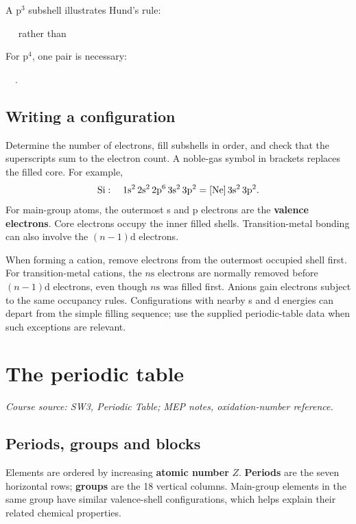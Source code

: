 \documentclass[a4paper,10pt]{article}
\newcommand{\source}[1]{{\small\textit{Course source: #1.}\par}}
\newcommand{\orbital}[1]{\fbox{\makebox[1.25em]{\ensuremath{#1}}}}
\newcommand{\chapterbreak}{\clearpage}
\begin{document}
A $\mathrm p^3$ subshell illustrates Hund's rule:
\begin{center}
\orbital{\uparrow}\ \orbital{\uparrow}\ \orbital{\uparrow}
\qquad rather than \qquad
\orbital{\uparrow\downarrow}\ \orbital{\uparrow}\ \orbital{}
\end{center}
For $\mathrm p^4$, one pair is necessary:
\begin{center}
\orbital{\uparrow\downarrow}\ \orbital{\uparrow}\ \orbital{\uparrow}.
\end{center}

\subsection{Writing a configuration}
Determine the number of electrons, fill subshells in order, and check that the
superscripts sum to the electron count. A noble-gas symbol in brackets replaces
the filled core. For example,
\[
 \ce{Si}:\quad 1\mathrm s^2\,2\mathrm s^2\,2\mathrm p^6\,3\mathrm s^2\,3\mathrm p^2
 =[\ce{Ne}]\,3\mathrm s^2\,3\mathrm p^2.
\]
For main-group atoms, the outermost s and p electrons are the
\textbf{valence electrons}. Core electrons occupy the inner filled shells.
Transition-metal bonding can also involve the $(n-1)\mathrm d$ electrons.

When forming a cation, remove electrons from the outermost occupied shell first.
For transition-metal cations, the $n\mathrm s$ electrons are normally removed
before $(n-1)\mathrm d$ electrons, even though $n\mathrm s$ was filled first.
Anions gain electrons subject to the same occupancy rules.
Configurations with nearby s and d energies can depart from the simple filling
sequence; use the supplied periodic-table data when such exceptions are relevant.

\chapterbreak
\section{The periodic table}
\label{sec:periodic}
\source{SW3, Periodic Table; MEP notes, oxidation-number reference}

\subsection{Periods, groups and blocks}
Elements are ordered by increasing \textbf{atomic number} $Z$.
\textbf{Periods} are the seven horizontal rows; \textbf{groups} are the 18 vertical
columns. Main-group elements in the same group have similar valence-shell
configurations, which helps explain their related chemical properties.
\end{document}
